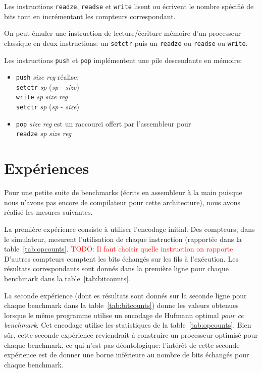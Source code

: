 \documentclass[architecture]{compas2018}
\newcommand{\todo}[1]{\textcolor{red}{TODO: #1}}
\begin{document}
Les instructions \texttt{readze}, \texttt{readse} et \texttt{write} lisent ou écrivent le nombre spécifié de bits tout en incrémentant les compteurs correspondant.

On peut émuler une instruction de lecture/écriture mémoire d'un processeur classique en deux instructions: un \texttt{setctr} puis un \texttt{readze} ou \texttt{readse} ou \texttt{write}.

Les instructions \texttt{push} et \texttt{pop} implémentent une pile descendante en mémoire: 
\begin{itemize}
\item \texttt{push} \emph{size} \emph{reg} réalise: \\
   \texttt{setctr} \textit{sp} (\textit{sp} - \textit{size})\\ \texttt{write}  \textit{sp} \textit{size} \textit{reg} \\ \texttt{setctr} \textit{sp} (\textit{sp} - \textit{size})
\item \texttt{pop} \emph{size} \emph{reg} est un raccourci offert par l'assembleur pour \\\texttt{readze} \textit{sp} \emph{size} \emph{reg}\\
  
\end{itemize}


\section{Expériences}

Pour une petite suite de benchmarks (écrits en assembleur à la main puisque nous n'avons pas encore de compilateur pour cette architecture), nous avons réalisé les mesures suivantes.

La première expérience consiste à utiliser l'encodage initial.
Des compteurs, dans le simulateur, mesurent l'utilisation de chaque instruction (rapportée dans la table~\ref{tab:opcounts}. \todo{Il faut choisir quelle instruction on rapporte}
D'autres compteurs comptent les bits échangés sur les fils à l'exécution.
Les résultats correspondants sont donnés dans la première  ligne pour chaque benchmark dans la table~\ref{tab:bitcounts}.

La seconde expérience (dont es résultats sont donnés sur la seconde ligne pour chaque benchmark dans la table~\ref{tab:bitcounts}) donne les valeurs obtenues lorsque le même programme utilise un encodage de Hufmann optimal \emph{pour ce benchmark}.
Cet encodage utilise les statistiques de la table~\ref{tab:opcounts}.
Bien sûr, cette seconde expérience reviendrait à construire un processeur optimisé pour chaque benchmark, ce qui n'est pas déontologique: l'intérêt de cette seconde expérience est de donner une borne inférieure au nombre de bits échangés pour chaque benchmark. 
\end{document}
